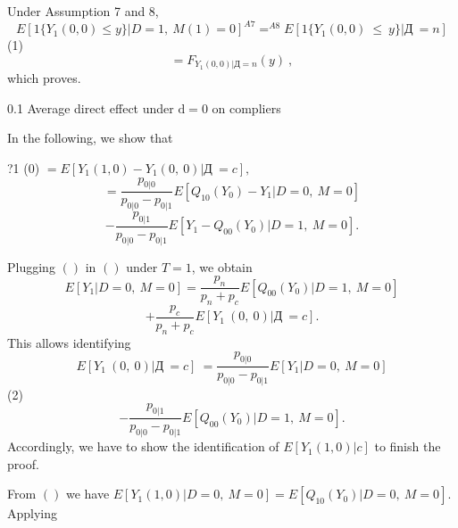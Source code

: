 \documentclass[a4paper,12pt]{article}
\begin{document}
Under Assumption 7 and 8,
$$
E[1\{Y_{1}(0,0)\leq y\}|D=1,\ M(1)=0]^{A7}=^{A8}E[1\{Y_{1}(0,0)\ \leq\ y\}|Д\ =n]
$$
(1)
$$
=F_{Y_{1}(0,0)|Д=n}(y)\ ,
$$
which proves.

0.1 Average direct effect under $\mathrm{d}=0$ on compliers

In the following, we show that
\begin{center}
?1 (0) $=E[Y_{1}(1,0)-Y_{1}(0,\ 0)|Д\ =c],$
$$
=\frac{p_{0|0}}{p_{0|0}-p_{0|1}}E[Q_{10}(Y_{0})-Y_{1}|D=0,\ M=0]
$$
$$
-\frac{p_{0|1}}{p_{0|0}-p_{0|1}}E[Y_{1}-Q_{00}(Y_{0})|D=1,\ M=0].
$$
\end{center}
Plugging $()$ in $()$ under $T=1$, we obtain
$$
E[Y_{1}|D=0,\ M=0]=\frac{p_{n}}{p_{n}+p_{c}}E[Q_{00}(Y_{0})|D=1,\ M=0]
$$
$$
+\frac{p_{c}}{p_{n}+p_{c}}E[Y_{1}\ (0,\ 0)|Д\ =c].
$$
This allows identifying
$$
E[Y_{1}\ (0,\ 0)|Д\ =c]\ =\frac{p_{0|0}}{p_{0|0}-p_{0|1}}E[Y_{1}|D=0,\ M=0]
$$
(2)
$$
-\frac{p_{0|1}}{p_{0|0}-p_{0|1}}E[Q_{00}(Y_{0})|D=1,\ M=0].
$$
Accordingly, we have to show the identification of $E[Y_{1}(1,0)|c]$ to finish the proof.

From $()$ we have $E[Y_{1}(1,0)|D=0,\ M=0]=E[Q_{10}(Y_{0})|D=0,\ M=0]$. Applying
\end{document}
